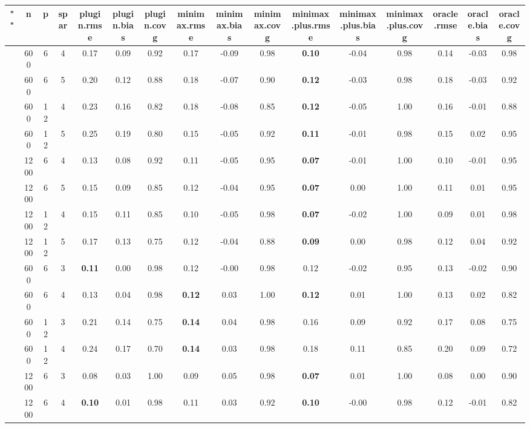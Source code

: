 \begin{table}[ht]
\centering
\begin{tabular}{||c|ccc||ccc|ccc|ccc|ccc}
  \hline
\hline
"" & n & p & spar & plugin.rmse & plugin.bias & plugin.covg & minimax.rmse & minimax.bias & minimax.covg & minimax.plus.rmse & minimax.plus.bias & minimax.plus.covg & oracle.rmse & oracle.bias & oracle.covg \\ 
  \hline
 & 600 & 6 & 4 & 0.17 & 0.09 & 0.92 & 0.17 & -0.09 & 0.98 & \bf 0.10 & -0.04 & 0.98 & 0.14 & -0.03 & 0.98 \\ 
   & 600 & 6 & 5 & 0.20 & 0.12 & 0.88 & 0.18 & -0.07 & 0.90 & \bf 0.12 & -0.03 & 0.98 & 0.18 & -0.03 & 0.92 \\ 
   & 600 & 12 & 4 & 0.23 & 0.16 & 0.82 & 0.18 & -0.08 & 0.85 & \bf 0.12 & -0.05 & 1.00 & 0.16 & -0.01 & 0.88 \\ 
   & 600 & 12 & 5 & 0.25 & 0.19 & 0.80 & 0.15 & -0.05 & 0.92 & \bf 0.11 & -0.01 & 0.98 & 0.15 & 0.02 & 0.95 \\ 
   & 1200 & 6 & 4 & 0.13 & 0.08 & 0.92 & 0.11 & -0.05 & 0.95 & \bf 0.07 & -0.01 & 1.00 & 0.10 & -0.01 & 0.95 \\ 
   & 1200 & 6 & 5 & 0.15 & 0.09 & 0.85 & 0.12 & -0.04 & 0.95 & \bf 0.07 & 0.00 & 1.00 & 0.11 & 0.01 & 0.95 \\ 
   & 1200 & 12 & 4 & 0.15 & 0.11 & 0.85 & 0.10 & -0.05 & 0.98 & \bf 0.07 & -0.02 & 1.00 & 0.09 & 0.01 & 0.98 \\ 
   & 1200 & 12 & 5 & 0.17 & 0.13 & 0.75 & 0.12 & -0.04 & 0.88 & \bf 0.09 & 0.00 & 0.98 & 0.12 & 0.04 & 0.92 \\ 
   \hline
 & 600 & 6 & 3 & \bf 0.11 & 0.00 & 0.98 & 0.12 & -0.00 & 0.98 & 0.12 & -0.02 & 0.95 & 0.13 & -0.02 & 0.90 \\ 
   & 600 & 6 & 4 & 0.13 & 0.04 & 0.98 & \bf 0.12 & 0.03 & 1.00 & \bf 0.12 & 0.01 & 1.00 & 0.13 & 0.02 & 0.82 \\ 
   & 600 & 12 & 3 & 0.21 & 0.14 & 0.75 & \bf 0.14 & 0.04 & 0.98 & 0.16 & 0.09 & 0.92 & 0.17 & 0.08 & 0.75 \\ 
   & 600 & 12 & 4 & 0.24 & 0.17 & 0.70 & \bf 0.14 & 0.03 & 0.98 & 0.18 & 0.11 & 0.85 & 0.20 & 0.09 & 0.72 \\ 
   & 1200 & 6 & 3 & 0.08 & 0.03 & 1.00 & 0.09 & 0.05 & 0.98 & \bf 0.07 & 0.01 & 1.00 & 0.08 & 0.00 & 0.90 \\ 
   & 1200 & 6 & 4 & \bf 0.10 & 0.01 & 0.98 & 0.11 & 0.03 & 0.92 & \bf 0.10 & -0.00 & 0.98 & 0.12 & -0.01 & 0.82 \\ 

\end{tabular}
\end{table}
